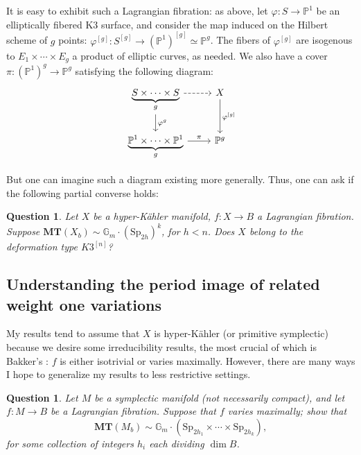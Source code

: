 \documentclass[12pt]{amsart}
\newcommand{\Sp}{\mathrm{Sp}}
\newtheorem{question}[theorem]{Question}
\theoremstyle{definition}
\numberwithin{equation}{section}
\begin{document}
It is easy to exhibit such a Lagrangian fibration: as above, 
let \(\varphi: S \to \mathbb{P}^1\) be an elliptically fibered K3 surface, 
and consider the map induced on the Hilbert scheme of \(g\) points:
\(\varphi^{[g]}: S^{[g]} \to (\mathbb{P}^1)^{[g]} \simeq \mathbb{P}^g\).
The fibers of \(\varphi^{[g]}\) are isogenous to \(E_1 \times \cdots \times E_g\)
a product of elliptic curves, as needed. We also have a cover 
\(\pi: (\mathbb{P}^1)^g \to \mathbb{P}^g\) satisfying the following diagram:
\begin{equation*}
\begin{tikzcd}
\underbrace{S \times \cdots \times S}_g \arrow[r, dashed] \arrow{d}{\varphi^g} & X \arrow{d}{\varphi^{[g]}} \\
\underbrace{\mathbb{P}^1 \times \cdots \times \mathbb{P}^1}_g \arrow{r}{\pi} & \mathbb{P}^g
\end{tikzcd}
\end{equation*}

But one can imagine such a diagram existing more generally. Thus, one can ask if 
the following partial converse holds:

\begin{question} \label{question-deformation-class}
    Let \(X\) be a hyper-K\"ahler manifold, \(f: X \to B\) a Lagrangian fibration. 
    Suppose \(\mathbf{MT}(X_b) \sim \mathbb{G}_m \cdot (\Sp_{2h})^k\), for \(h < n\). 
    Does \(X\) belong to the deformation type \(K3^{[n]}\)?
\end{question}



\subsection{Understanding the period image of related weight one variations}

My results tend to assume that \(X\) is hyper-K\"ahler (or primitive symplectic) 
because we desire some irreducibility results, the most crucial of which is Bakker's 
\cite{bakker25}: \(f\) is either isotrivial or varies maximally. However, there are 
many ways I hope to generalize my results to less restrictive settings. 

\begin{question}
    Let \(M\) be a symplectic manifold (not necessarily compact), and let \(f: M \to B\)
    be a Lagrangian fibration. Suppose that \(f\) varies maximally; show that
    \begin{equation*}
        \mathbf{MT}(M_b) \sim \mathbb{G}_m \cdot 
        \left(\Sp_{2h_1} \times \cdots \times \Sp_{2h_k}\right),
    \end{equation*}
    for some collection of integers \(h_i\) each dividing \(\dim B\).
\end{question}
\end{document}
